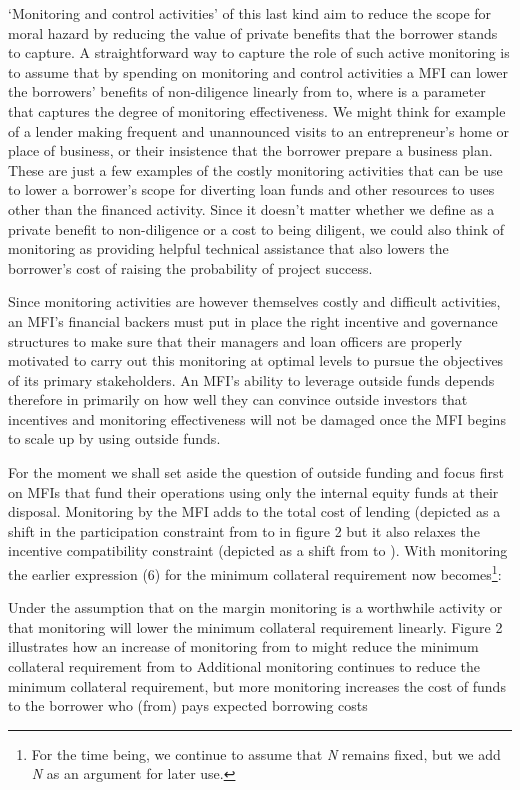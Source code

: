 \documentclass{article}
\begin{document}
`Monitoring and control activities' of this last kind aim to reduce the
scope for moral hazard by reducing the value of private benefits that
the borrower stands to capture. A straightforward way to capture the
role of such active monitoring is to assume that by spending on
monitoring and control activities a MFI can lower the borrowers'
benefits of non-diligence linearly from to, where is a parameter that
captures the degree of monitoring effectiveness. We might think for
example of a lender making frequent and unannounced visits to an
entrepreneur's home or place of business, or their insistence that the
borrower prepare a business plan. These are just a few examples of the
costly monitoring activities that can be use to lower a borrower's scope
for diverting loan funds and other resources to uses other than the
financed activity. Since it doesn't matter whether we define as a
private benefit to non-diligence or a cost to being diligent, we could
also think of monitoring as providing helpful technical assistance that
also lowers the borrower's cost of raising the probability of project
success.

Since monitoring activities are however themselves costly and difficult
activities, an MFI's financial backers must put in place the right
incentive and governance structures to make sure that their managers and
loan officers are properly motivated to carry out this monitoring at
optimal levels to pursue the objectives of its primary stakeholders. An
MFI's ability to leverage outside funds depends therefore in primarily
on how well they can convince outside investors that incentives and
monitoring effectiveness will not be damaged once the MFI begins to
scale up by using outside funds.

For the moment we shall set aside the question of outside funding and
focus first on MFIs that fund their operations using only the internal
equity funds at their disposal. Monitoring by the MFI adds to the total
cost of lending (depicted as a shift in the participation constraint
from to in figure 2 but it also relaxes the incentive compatibility
constraint (depicted as a shift from to ). With monitoring the earlier
expression (6) for the minimum collateral requirement now
becomes\footnote{For the time being, we continue to assume that \emph{N}
  remains fixed, but we add \emph{N} as an argument for later use.}:


Under the assumption that on the margin monitoring is a worthwhile
activity or that monitoring will lower the minimum collateral
requirement linearly. Figure 2 illustrates how an increase of monitoring
from to might reduce the minimum collateral requirement from to
Additional monitoring continues to reduce the minimum collateral
requirement, but more monitoring increases the cost of funds to the
borrower who (from) pays expected borrowing costs
\end{document}
